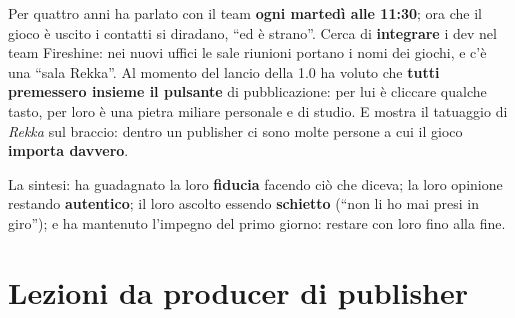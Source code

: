 Per quattro anni ha parlato con il team \textbf{ogni martedì alle 11:30}; ora che
il gioco è uscito i contatti si diradano, ``ed è strano''. Cerca di
\textbf{integrare} i dev nel team Fireshine: nei nuovi uffici le sale riunioni
portano i nomi dei giochi, e c'è una ``sala Rekka''. Al momento del lancio della
1.0 ha voluto che \textbf{tutti premessero insieme il pulsante} di pubblicazione:
per lui è cliccare qualche tasto, per loro è una pietra miliare personale e di
studio. E mostra il tatuaggio di \emph{Rekka} sul braccio: dentro un publisher ci
sono molte persone a cui il gioco \textbf{importa davvero}.

La sintesi: ha guadagnato la loro \textbf{fiducia} facendo ciò che diceva; la loro
opinione restando \textbf{autentico}; il loro ascolto essendo \textbf{schietto}
(``non li ho mai presi in giro''); e ha mantenuto l'impegno del primo giorno:
restare con loro fino alla fine.

\section{Lezioni da producer di publisher}
\label{sec:c2-2-lezioni}

